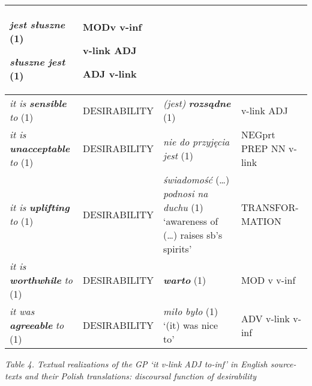 \documentclass[12pt]{article}
\newenvironment{styleStandard}{\setlength\leftskip{0cm}\setlength\rightskip{0cm plus 1fil}\setlength\parindent{0cm}\setlength\parfillskip{0pt plus 1fil}\setlength\parskip{0in plus 1pt}\writerlistparindent\writerlistleftskip\leavevmode\normalfont\normalsize\writerlistlabel\ignorespaces}{\unskip\vspace{0.111in plus 0.0111in}\par}
\newcommand\writerlistleftskip{}
\newcommand\writerlistparindent{}
\newcommand\writerlistlabel{}
\begin{document}
\begin{flushleft}
\begin{supertabular}{|m{1.2761599in}|m{1.1018599in}|m{1.3976599in}|m{0.8073598in}|}
\textit{jest }\textbf{\textit{słuszne}} (1)

\textbf{\textit{słuszne}}\textit{ jest} (1) &
MODv v-inf

v-link ADJ

ADJ v-link\\\hline
\textit{it is }\textbf{\textit{sensible}}\textit{ to} (1) &
DESIRABILITY &
\textit{(jest) }\textbf{\textit{rozsądne}}\textbf{ }(1) &
v-link ADJ\\\hline
\textit{it is }\textbf{\textit{unacceptable}}\textit{ to} (1)  &
DESIRABILITY &
\textit{nie do przyjęcia jest} (1) &
NEGprt PREP NN v-link\\\hline
\textit{it is }\textbf{\textit{uplifting}}\textit{ to }(1) &
DESIRABILITY &
\textit{świadomość} (…) \textit{podnosi na duchu} (1) ‘awareness of (…) raises sb’s spirits' &
TRANSFOR-MATION\\\hline
\textit{it is }\textbf{\textit{worthwhile}}\textit{ to} (1) &
DESIRABILITY &
\textbf{\textit{warto}}\textbf{ }(1) &
MOD v v-inf\\\hline
\textit{it was }\textbf{\textit{agreeable}}\textit{ to} (1)  &
DESIRABILITY &
\textit{miło było} (1) ‘(it) was nice to’ &
ADV v-link v-inf\\\hline
\end{supertabular}
\end{flushleft}
\addtocounter{footnote}{-2}
\begin{styleStandard}
\textit{Table 4. Textual realizations of the GP ‘it v-link ADJ to-inf’ in English source-texts and their Polish translations: discoursal function of desirability}
\end{styleStandard}
\end{document}
